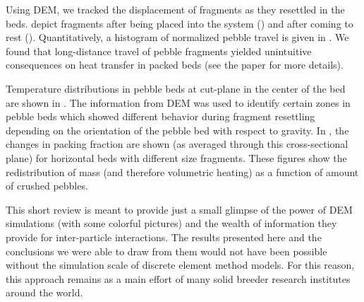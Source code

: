 \documentclass[11pt]{report} %
\begin{document}
Using DEM, we tracked the displacement of fragments as they resettled in the beds.  depict fragments after being placed into the system () and after coming to rest (). Quantitatively, a histogram of normalized pebble travel is given in . We found that long-distance travel of pebble fragments yielded unintuitive consequences on heat transfer in packed beds (see the paper for more details). 

Temperature distributions in pebble beds at cut-plane in the center of the bed are shown in . The information from DEM was used to identify certain zones in pebble beds which showed different behavior during fragment resettling depending on the orientation of the pebble bed with respect to gravity. In , the changes in packing fraction are shown (as averaged through this cross-sectional plane) for horizontal beds with different size fragments. These figures show the redistribution of mass (and therefore volumetric heating) as a function of amount of crushed pebbles.

This short review is meant to provide just a small glimpse of the power of DEM simulations (with some colorful pictures) and the wealth of information they provide for inter-particle interactions. The results presented here and the conclusions we were able to draw from them would not have been possible without the simulation scale of discrete element method models. For this reason, this approach remains as a main effort of many solid breeder research institutes around the world.
\end{document}
